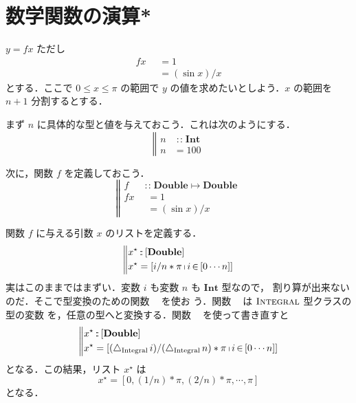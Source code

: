 \documentclass[a5paper,twoside,fleqn,draft]{jsbook}
\newcommand{\mBrace}{\Vert}
\newcommand{\mKeyword}[1]{\mathsf{#1}} %
\newcommand{\mOtherwiseKeyword}{\mKeyword{otherwise}}
\DeclareMathOperator{\mOtherwise}{\mOtherwiseKeyword}
\newcommand{\mUpCast}{\bigtriangleup}
\DeclareMathOperator{\mFromIntegral}{\mUpCast_\text{Integral}}
\DeclareMathOperator{\mFrom}{\in}
\DeclareMathOperator{\mIn}{{:\!:}}
\DeclareMathOperator{\mMapsTo}{\mapsto}
\newcommand{\mType}[1]{\mathbf{#1}}
\newcommand{\mDoubleType}{\mType{Double}}
\newcommand{\mIntType}{\mType{Int}}
\newcommand{\mListType}[1]{[\mType{#1}]}
\newcommand{\mListWith}[1]{\left[#1\right]}
\newcommand{\mGenericTypeClass}[1]{\textsc{#1}} %
\newcommand{\mIntegralTypeClass}{\mGenericTypeClass{Integral}}
\newcommand{\mList}[1]{{#1}^\mathrm{\star}}
\newcommand{\mGuard}[1]{\mathop{\mid_{#1}}}
\DeclareMathOperator{\mListComp}{\shortmid}
\newcommand{\mProj}[2]{#1\mMapsTo#2}
\begin{document}
\section{数学関数の演算*}

$y=fx$ ただし
\begin{equation}
\begin{aligned}
fx&\mGuard{x\equiv0}=1\\
&\mGuard{\mOtherwise}=(\sin x)/x
\end{aligned}
\end{equation}
とする．ここで $0\le x\le\pi$ の範囲で $y$ の値を求めたいとしよう．$x$
の範囲を $n+1$ 分割するとする．

まず $n$ に具体的な型と値を与えておこう．これは次のようにする．
\begin{equation}
\left\mBrace
\begin{aligned}
n&\mIn\mIntType\\
n&=100
\end{aligned}
\right.
\end{equation}

次に，関数 $f$ を定義しておこう．
\begin{equation}
\left\mBrace
\begin{aligned}
f&\mIn\mProj{\mDoubleType}{\mDoubleType}\\
fx&\mGuard{x\equiv0}=1\\
&\mGuard{\mOtherwise}=(\sin x)/x
\end{aligned}
\right.
\end{equation}

関数 $f$ に与える引数 $x$ のリストを定義する．
\begin{equation*}
\left\mBrace
\begin{aligned}
\mList{x}&\mIn{}\mListType{\mDoubleType}\\
\mList{x}&=\mListWith{i/n*\pi\mListComp i\mFrom\mListWith{0\dotsb n}}
\end{aligned}
\right.
\end{equation*}
実はこのままではまずい．変数 $i$ も変数 $n$ も $\mIntType$ 型なので，
割り算が出来ないのだ．そこで型変換のための関数 $\mFromIntegral$ を使お
う．関数 $\mFromIntegral$ は $\mIntegralTypeClass$ 型クラスの型の変数
を，任意の型へと変換する．関数 $\mFromIntegral$ を使って書き直すと
\begin{equation}
\left\mBrace
\begin{aligned}
\mList{x}&\mIn{}\mListType{\mDoubleType}\\
\mList{x}&=\mListWith{(\mFromIntegral i)/(\mFromIntegral n)*\pi\mListComp i\mFrom\mListWith{0\dotsb n}}
\end{aligned}
\right.
\end{equation}
となる．この結果，リスト $\mList{x}$ は
\begin{equation}
\mList{x}=\mListWith{0,(1/n)*\pi,(2/n)*\pi,\dotsb,\pi}
\end{equation}
となる．
\end{document}
